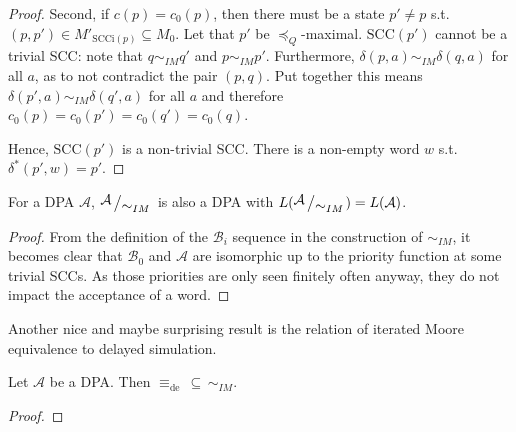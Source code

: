 \begin{proof}
	Second, if $c(p) = c_0(p)$, then there must be a state $p' \neq p$ s.t. $(p, p') \in M'_{\text{SCCi}(p)} \subseteq M_0$. Let that $p'$ be $\preceq_Q$-maximal. $\text{SCC}(p')$ cannot be a trivial SCC: note that $q \sim_{IM} q'$ and $p \sim_{IM} p'$. Furthermore, $\delta(p, a) \sim_{IM} \delta(q, a)$ for all $a$, as to not contradict the pair $(p, q)$. Put together this means $\delta(p', a) \sim_{IM} \delta(q', a)$ for all $a$ and therefore $c_0(p) = c_0(p') = c_0(q') = c_0(q)$.
	
	Hence, $\text{SCC}(p')$ is a non-trivial SCC. There is a non-empty word $w$ s.t. $\delta^*(p', w) = p'$. %
\end{proof}

\begin{theorem}
	For a DPA $\mathcal{A}$, $\bigslant{\mathcal{A}}{\sim_{IM}}$ is also a DPA with $L(\bigslant{\mathcal{A}}{\sim_{IM}}) = L(\mathcal{A})$.
\end{theorem}

\begin{proof}
	From the definition of the $\mathcal{B}_i$ sequence in the construction of $\sim_{IM}$, it becomes clear that $\mathcal{B}_0$ and $\mathcal{A}$ are isomorphic up to the priority function at some trivial SCCs. As those priorities are only seen finitely often anyway, they do not impact the acceptance of a word. 
\end{proof}

\vspace{0.6cm}
Another nice and maybe surprising result is the relation of iterated Moore equivalence to delayed simulation.

\begin{theorem}
	Let $\mathcal{A}$ be a DPA. Then $\equiv_\text{de} \,\subseteq\, \sim_{IM}$.
\end{theorem}

\begin{proof}
\end{proof}














